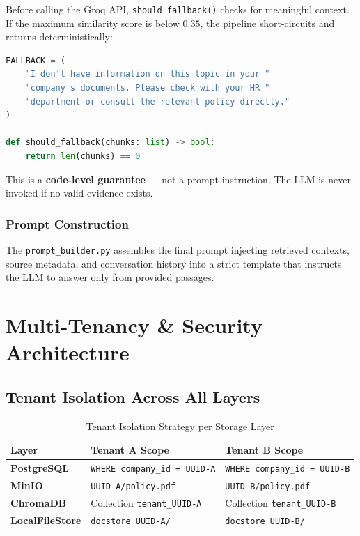\documentclass[12pt,a4paper]{report}
\begin{document}
Before calling the Groq API, \texttt{should\_fallback()} checks for meaningful context. If the maximum similarity score is below $0.35$, the pipeline short-circuits and returns deterministically:

\begin{lstlisting}[language=Python, caption=Deterministic hallucination protection]
FALLBACK = (
    "I don't have information on this topic in your "
    "company's documents. Please check with your HR "
    "department or consult the relevant policy directly."
)

def should_fallback(chunks: list) -> bool:
    return len(chunks) == 0
\end{lstlisting}

This is a \textbf{code-level guarantee} — not a prompt instruction. The LLM is never invoked if no valid evidence exists.

\subsection{Prompt Construction}

The \texttt{prompt\_builder.py} assembles the final prompt injecting retrieved contexts, source metadata, and conversation history into a strict template that instructs the LLM to answer only from provided passages.

\clearpage
\chapter{Multi-Tenancy \& Security Architecture}

\section{Tenant Isolation Across All Layers}

\begin{table}[htbp]
\centering
\caption{Tenant Isolation Strategy per Storage Layer}
\renewcommand{\arraystretch}{1.5}
\begin{tabularx}{\linewidth}{>{\bfseries\sffamily}l X X}
\toprule
\rowcolor{DeepRose!10}
Layer & Tenant A Scope & Tenant B Scope \\
\midrule
PostgreSQL   & \texttt{WHERE company\_id = UUID-A} & \texttt{WHERE company\_id = UUID-B} \\
MinIO        & \texttt{UUID-A/policy.pdf} & \texttt{UUID-B/policy.pdf} \\
ChromaDB     & Collection \texttt{tenant\_UUID-A} & Collection \texttt{tenant\_UUID-B} \\
LocalFileStore & \texttt{docstore\_UUID-A/} & \texttt{docstore\_UUID-B/} \\
\bottomrule
\end{tabularx}
\end{table}
\end{document}
